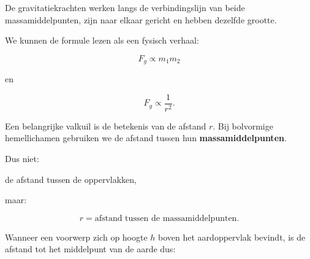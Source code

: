 \documentclass{ximera}
\begin{document}
De gravitatiekrachten werken langs de verbindingslijn van beide massamiddelpunten, zijn naar elkaar gericht en hebben dezelfde grootte.

\begin{center}
      \end{center}


We kunnen de formule lezen als een fysisch verhaal:

\[
\boxed{
F_g
\propto
m_1m_2
}
\]

en

\[
\boxed{
F_g
\propto
\frac{1}{r^2}.
}
\]



Een belangrijke valkuil is de betekenis van de afstand $r$. Bij bolvormige hemellichamen gebruiken we de afstand tussen hun
\textbf{massamiddelpunten}.

Dus niet:

\begin{center}
de afstand tussen de oppervlakken,
\end{center}

maar:

\[
\boxed{
r=\text{afstand tussen de massamiddelpunten}.
}
\]


Wanneer een voorwerp zich op hoogte $h$ boven het aardoppervlak
bevindt, is de afstand tot het middelpunt van de aarde dus:
\end{document}
